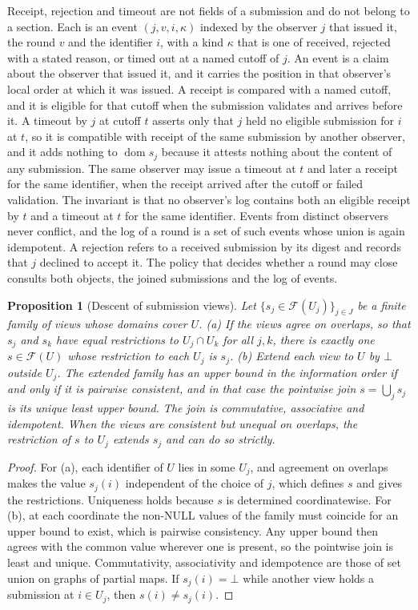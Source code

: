 \documentclass[11pt]{article}
\newtheorem{proposition}{Proposition}
\theoremstyle{definition}
\theoremstyle{remark}
\begin{document}
Receipt, rejection and timeout are not fields of a submission and do not belong to a section. Each is an event $(j,v,i,\kappa)$ indexed by the observer $j$ that issued it, the round $v$ and the identifier $i$, with a kind $\kappa$ that is one of received, rejected with a stated reason, or timed out at a named cutoff of $j$. An event is a claim about the observer that issued it, and it carries the position in that observer's local order at which it was issued. A receipt is compared with a named cutoff, and it is eligible for that cutoff when the submission validates and arrives before it. A timeout by $j$ at cutoff $t$ asserts only that $j$ held no eligible submission for $i$ at $t$, so it is compatible with receipt of the same submission by another observer, and it adds nothing to $\operatorname{dom}s_j$ because it attests nothing about the content of any submission. The same observer may issue a timeout at $t$ and later a receipt for the same identifier, when the receipt arrived after the cutoff or failed validation. The invariant is that no observer's log contains both an eligible receipt by $t$ and a timeout at $t$ for the same identifier. Events from distinct observers never conflict, and the log of a round is a set of such events whose union is again idempotent. A rejection refers to a received submission by its digest and records that $j$ declined to accept it. The policy that decides whether a round may close consults both objects, the joined submissions and the log of events.

\begin{proposition}[Descent of submission views]\label{prop:records}
Let $\{s_j\in\mathcal F(U_j)\}_{j\in J}$ be a finite family of views whose domains cover $U$.
(a) If the views agree on overlaps, so that $s_j$ and $s_k$ have equal restrictions to $U_j\cap U_k$ for all $j,k$, there is exactly one $s\in\mathcal F(U)$ whose restriction to each $U_j$ is $s_j$.
(b) Extend each view to $U$ by $\bot$ outside $U_j$. The extended family has an upper bound in the information order if and only if it is pairwise consistent, and in that case the pointwise join $s=\bigcup_j s_j$ is its unique least upper bound. The join is commutative, associative and idempotent. When the views are consistent but unequal on overlaps, the restriction of $s$ to $U_j$ extends $s_j$ and can do so strictly.
\end{proposition}

\begin{proof}
For (a), each identifier of $U$ lies in some $U_j$, and agreement on overlaps makes the value $s_j(i)$ independent of the choice of $j$, which defines $s$ and gives the restrictions. Uniqueness holds because $s$ is determined coordinatewise. For (b), at each coordinate the non-NULL values of the family must coincide for an upper bound to exist, which is pairwise consistency. Any upper bound then agrees with the common value wherever one is present, so the pointwise join is least and unique. Commutativity, associativity and idempotence are those of set union on graphs of partial maps. If $s_j(i)=\bot$ while another view holds a submission at $i\in U_j$, then $s(i)\neq s_j(i)$.
\end{proof}
\end{document}
